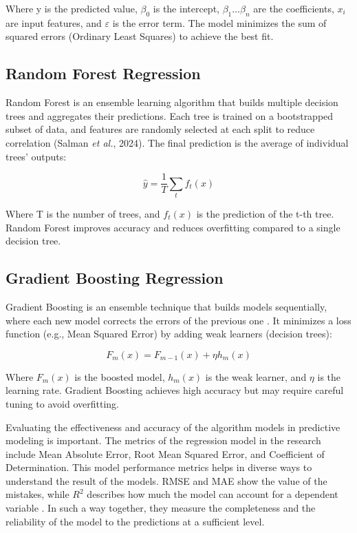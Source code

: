 \documentclass[12pt, a4paper, oneside]{book}
\begin{document}
Where y is the predicted value, $\beta_0$ is the intercept, $\beta_1 \ldots \beta_n$ are the coefficients, $x_i$ are input features, and $\varepsilon$ is the error term. The model minimizes the sum of squared errors (Ordinary Least Squares) to achieve the best fit.

\subsection{Random Forest Regression}

Random Forest is an ensemble learning algorithm that builds multiple decision trees and aggregates their predictions. Each tree is trained on a bootstrapped subset of data, and features are randomly selected at each split to reduce correlation (Salman \emph{et al.}, 2024). The final prediction is the average of individual trees' outputs:

\[
\hat{y} = \frac{1}{T} \sum_{t} f_t(x)
\]

Where T is the number of trees, and $f_t(x)$ is the prediction of the t-th tree. Random Forest improves accuracy and reduces overfitting compared to a single decision tree.

\subsection{Gradient Boosting Regression}

Gradient Boosting is an ensemble technique that builds models sequentially, where each new model corrects the errors of the previous one \cite{konstantinov2021}. It minimizes a loss function (e.g., Mean Squared Error) by adding weak learners (decision trees):

\[
F_m(x) = F_{m-1}(x) + \eta h_m(x)
\]

Where $F_m(x)$ is the boosted model, $h_m(x)$ is the weak learner, and $\eta$ is the learning rate. Gradient Boosting achieves high accuracy but may require careful tuning to avoid overfitting.

Evaluating the effectiveness and accuracy of the algorithm models in predictive modeling is important. The metrics of the regression model in the research include Mean Absolute Error, Root Mean Squared Error, and Coefficient of Determination. This model performance metrics helps in diverse ways to understand the result of the models. RMSE and MAE show the value of the mistakes, while $R^2$ describes how much the model can account for a dependent variable \cite{chugh2020}. In such a way together, they measure the completeness and the reliability of the model to the predictions at a sufficient level.
\end{document}
